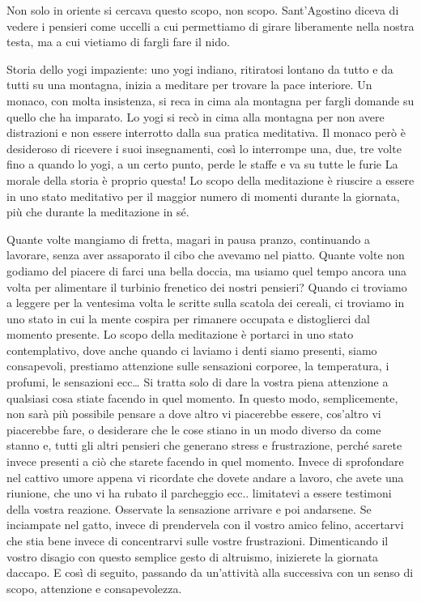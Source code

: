 \documentclass[12pt]{book} %
\begin{document}
Non solo in oriente si cercava questo scopo, non scopo. Sant'Agostino diceva di vedere i pensieri come uccelli a cui
permettiamo di girare liberamente nella nostra testa, ma a cui vietiamo di fargli fare il nido. 

\begin{mdframed}[linewidth=1pt]
Storia dello yogi impaziente: uno yogi indiano, ritiratosi lontano da tutto e da tutti su una montagna, inizia a
meditare per trovare la pace interiore. Un monaco, con molta insistenza, si reca in cima ala montagna per fargli
domande su quello che ha imparato. Lo yogi si recò in cima alla montagna per non avere distrazioni e non essere
interrotto dalla sua pratica meditativa. Il monaco però è desideroso di ricevere i suoi insegnamenti, così lo
interrompe una, due, tre volte fino a quando lo yogi, a un certo punto, perde le staffe e va su tutte le furie La
morale della storia è proprio questa! Lo scopo della meditazione è riuscire a essere in uno stato meditativo per il
maggior numero di momenti durante la giornata, più che durante la meditazione in sé.
\end{mdframed}

Quante volte mangiamo di fretta, magari in pausa pranzo, continuando a lavorare, senza aver assaporato il cibo che
avevamo nel piatto. Quante volte non godiamo del piacere di farci una bella doccia, ma usiamo quel tempo ancora una
volta per alimentare il turbinio frenetico dei nostri pensieri? Quando ci troviamo a leggere per la ventesima volta le
scritte sulla scatola dei cereali, ci troviamo in uno stato in cui la mente cospira per rimanere occupata e
distoglierci dal momento presente. Lo scopo della meditazione è portarci in uno stato contemplativo, dove anche quando
ci laviamo i denti siamo presenti, siamo consapevoli, prestiamo attenzione sulle sensazioni corporee, la temperatura, i
profumi, le sensazioni ecc… Si tratta solo di dare la vostra piena attenzione a qualsiasi cosa stiate facendo in quel
momento. In questo modo, semplicemente, non sarà più possibile pensare a dove altro vi piacerebbe essere,
cos'altro vi piacerebbe fare, o desiderare che le cose stiano in un modo diverso da come stanno e,
tutti gli altri pensieri che generano stress e frustrazione, perché sarete invece presenti a ciò che starete facendo in
quel momento. Invece di sprofondare nel cattivo umore appena vi ricordate che dovete andare a lavoro, che avete una
riunione, che uno vi ha rubato il parcheggio ecc.. limitatevi a essere testimoni della vostra reazione. 
Osservate la sensazione arrivare e poi andarsene. Se inciampate nel gatto, invece di prendervela con il vostro
amico felino, accertarvi che stia bene invece di concentrarvi sulle vostre frustrazioni. Dimenticando il vostro disagio
con questo semplice gesto di altruismo, inizierete la giornata daccapo. E così di seguito, passando da
un'attività alla successiva con un senso di scopo, attenzione e consapevolezza.
\end{document}
